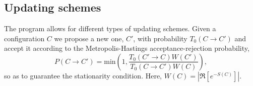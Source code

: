 
\subsection{Updating schemes}\label{sec:updating}
%
The program allows for different types of updating schemes.    Given a configuration $C$ we propose a new one, $C'$, with probability $T_0(C \rightarrow C')$  and accept it according to   the  Metropolis-Hastings   acceptance-rejection probability, 
\begin{equation}
	P(C \rightarrow C') =  \text{min}  \left( 1, \frac{T_0(C' \rightarrow C) W(C')}{T_0(C \rightarrow C') W(C)} \right),
\end{equation}
so as to guarantee the stationarity condition.  Here, $ W(C) = \left| \Re \left[ e^{-S(C)} \right] \right|   $.

